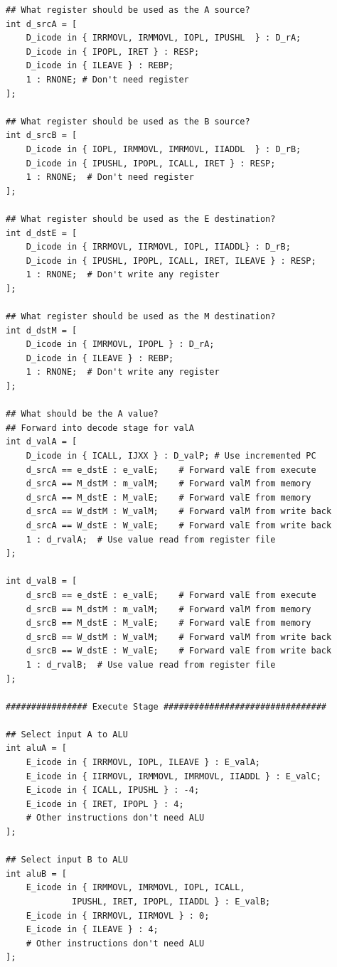 \documentclass{article}
\begin{document}
\begin{itemize}
\begin{lstlisting}[caption={}]
## What register should be used as the A source?
int d_srcA = [
	D_icode in { IRRMOVL, IRMMOVL, IOPL, IPUSHL  } : D_rA;
	D_icode in { IPOPL, IRET } : RESP;
	D_icode in { ILEAVE } : REBP;
	1 : RNONE; # Don't need register
];

## What register should be used as the B source?
int d_srcB = [
	D_icode in { IOPL, IRMMOVL, IMRMOVL, IIADDL  } : D_rB;
	D_icode in { IPUSHL, IPOPL, ICALL, IRET } : RESP;
	1 : RNONE;  # Don't need register
];

## What register should be used as the E destination?
int d_dstE = [
	D_icode in { IRRMOVL, IIRMOVL, IOPL, IIADDL} : D_rB;
	D_icode in { IPUSHL, IPOPL, ICALL, IRET, ILEAVE } : RESP;
	1 : RNONE;  # Don't write any register
];

## What register should be used as the M destination?
int d_dstM = [
	D_icode in { IMRMOVL, IPOPL } : D_rA;
	D_icode in { ILEAVE } : REBP;
	1 : RNONE;  # Don't write any register
];

## What should be the A value?
## Forward into decode stage for valA
int d_valA = [
	D_icode in { ICALL, IJXX } : D_valP; # Use incremented PC
	d_srcA == e_dstE : e_valE;    # Forward valE from execute
	d_srcA == M_dstM : m_valM;    # Forward valM from memory
	d_srcA == M_dstE : M_valE;    # Forward valE from memory
	d_srcA == W_dstM : W_valM;    # Forward valM from write back
	d_srcA == W_dstE : W_valE;    # Forward valE from write back
	1 : d_rvalA;  # Use value read from register file
];

int d_valB = [
	d_srcB == e_dstE : e_valE;    # Forward valE from execute
	d_srcB == M_dstM : m_valM;    # Forward valM from memory
	d_srcB == M_dstE : M_valE;    # Forward valE from memory
	d_srcB == W_dstM : W_valM;    # Forward valM from write back
	d_srcB == W_dstE : W_valE;    # Forward valE from write back
	1 : d_rvalB;  # Use value read from register file
];

################ Execute Stage ################################

## Select input A to ALU
int aluA = [
	E_icode in { IRRMOVL, IOPL, ILEAVE } : E_valA;
	E_icode in { IIRMOVL, IRMMOVL, IMRMOVL, IIADDL } : E_valC;
	E_icode in { ICALL, IPUSHL } : -4;
	E_icode in { IRET, IPOPL } : 4;
	# Other instructions don't need ALU
];

## Select input B to ALU
int aluB = [
	E_icode in { IRMMOVL, IMRMOVL, IOPL, ICALL,
		     IPUSHL, IRET, IPOPL, IIADDL } : E_valB;
	E_icode in { IRRMOVL, IIRMOVL } : 0;
	E_icode in { ILEAVE } : 4;
	# Other instructions don't need ALU
];


\end{lstlisting}
\end{itemize}
\end{document}
